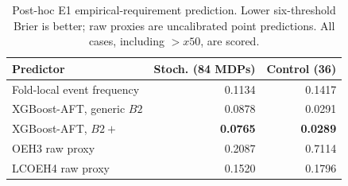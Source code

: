\begin{table}[t]
\caption{Post-hoc E1 empirical-requirement prediction. Lower six-threshold Brier is better; raw proxies are uncalibrated point predictions. All cases, including $>x50$, are scored.}
\label{tab:difficulty}
\centering\footnotesize
\begin{tabular}{lrr}
\toprule
Predictor & Stoch. (84 MDPs) & Control (36) \\
\midrule
Fold-local event frequency & 0.1134 & 0.1417 \\
XGBoost-AFT, generic $B2$ & 0.0878 & 0.0291 \\
XGBoost-AFT, $B2+$\OEH{} & \textbf{0.0765} & \textbf{0.0289} \\
OEH3 raw proxy & 0.2087 & 0.7114 \\
LCOEH4 raw proxy & 0.1520 & 0.1796 \\
\bottomrule
\end{tabular}
\end{table}
